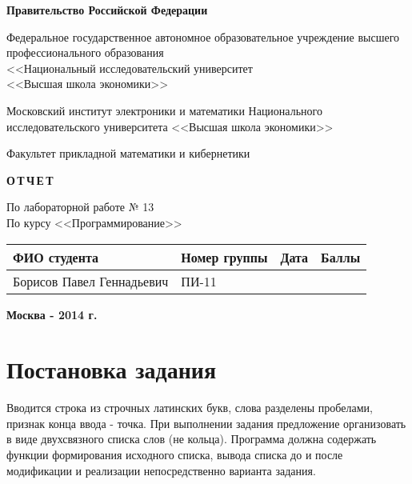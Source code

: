 \documentclass[a4paper,12pt,fleqn,twoside]{scrartcl}
\begin{document}
\begin{center}

\large
\bfseries
Правительство Российской Федерации
\bigskip


Федеральное государственное автономное образовательное учреждение высшего профессионального образования\\
<<Национальный исследовательский университет\\
<<Высшая школа экономики>>\\
\bigskip
\mdseries

Московский институт электроники и математики Национального исследовательского университета <<Высшая школа экономики>>
\vspace{4ex}

Факультет прикладной математики и кибернетики
\vfill

\bfseries
\sffamily
О\,Т\,Ч\,Е\,Т\,\\
\bigskip

По лабораторной работе № 13\\
\bigskip
По курсу <<Программирование>>
\rmfamily \mdseries

\vfill

\small
\extrarowheight=3pt
\begin{tabular}{|l|l|l|l|}
\hline
ФИО студента & Номер группы & Дата & Баллы \\\hline
\multirow{4}{*}{Борисов Павел Геннадьевич} & \multirow{4}{*}{ПИ-11} & \phantom{22.22.2222} & \phantom{10} \\\cline{3-4}
&&&\\\cline{3-4}
&&&\\\cline{3-4}
&&&\\\hline

\end{tabular}
\vfill


\bfseries \normalsize Москва - 2014 г.

\end{center}

\newpage
\section*{Постановка задания}
Вводится строка из строчных латинских букв, слова разделены пробелами, признак конца ввода - точка. При выполнении задания предложение организовать в виде двухсвязного списка слов (не кольца).
Программа должна содержать функции формирования исходного списка, вывода списка до и после модификации и реализации непосредственно варианта задания.
\end{document}
